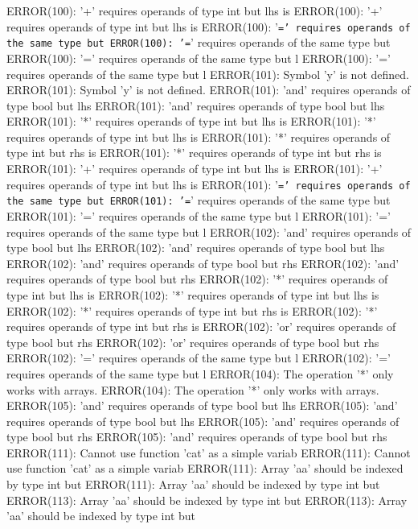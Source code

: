 \documentclass[12pt]{book}
\begin{document}
ERROR(100): '+' requires operands of type int but lhs is        ERROR(100): '+' requires operands of type int but lhs is
ERROR(100): '\texttt{=' requires operands of the same type but 	ERROR(100): '=}' requires operands of the same type but 
ERROR(100): '=' requires operands of the same type but l        ERROR(100): '=' requires operands of the same type but l
ERROR(101): Symbol 'y' is not defined.                                ERROR(101): Symbol 'y' is not defined.
ERROR(101): 'and' requires operands of type bool but lhs        ERROR(101): 'and' requires operands of type bool but lhs
ERROR(101): '*' requires operands of type int but lhs is        ERROR(101): '*' requires operands of type int but lhs is
ERROR(101): '*' requires operands of type int but rhs is        ERROR(101): '*' requires operands of type int but rhs is
ERROR(101): '+' requires operands of type int but lhs is        ERROR(101): '+' requires operands of type int but lhs is
ERROR(101): '\texttt{=' requires operands of the same type but 	ERROR(101): '=}' requires operands of the same type but 
ERROR(101): '=' requires operands of the same type but l        ERROR(101): '=' requires operands of the same type but l
ERROR(102): 'and' requires operands of type bool but lhs        ERROR(102): 'and' requires operands of type bool but lhs
ERROR(102): 'and' requires operands of type bool but rhs        ERROR(102): 'and' requires operands of type bool but rhs
ERROR(102): '*' requires operands of type int but lhs is        ERROR(102): '*' requires operands of type int but lhs is
ERROR(102): '*' requires operands of type int but rhs is        ERROR(102): '*' requires operands of type int but rhs is
ERROR(102): 'or' requires operands of type bool but rhs         ERROR(102): 'or' requires operands of type bool but rhs 
ERROR(102): '=' requires operands of the same type but l        ERROR(102): '=' requires operands of the same type but l
ERROR(104): The operation '*' only works with arrays.                ERROR(104): The operation '*' only works with arrays.
ERROR(105): 'and' requires operands of type bool but lhs        ERROR(105): 'and' requires operands of type bool but lhs
ERROR(105): 'and' requires operands of type bool but rhs        ERROR(105): 'and' requires operands of type bool but rhs
ERROR(111): Cannot use function 'cat' as a simple variab        ERROR(111): Cannot use function 'cat' as a simple variab
ERROR(111): Array 'aa' should be indexed by type int but        ERROR(111): Array 'aa' should be indexed by type int but
ERROR(113): Array 'aa' should be indexed by type int but        ERROR(113): Array 'aa' should be indexed by type int but
\end{document}
